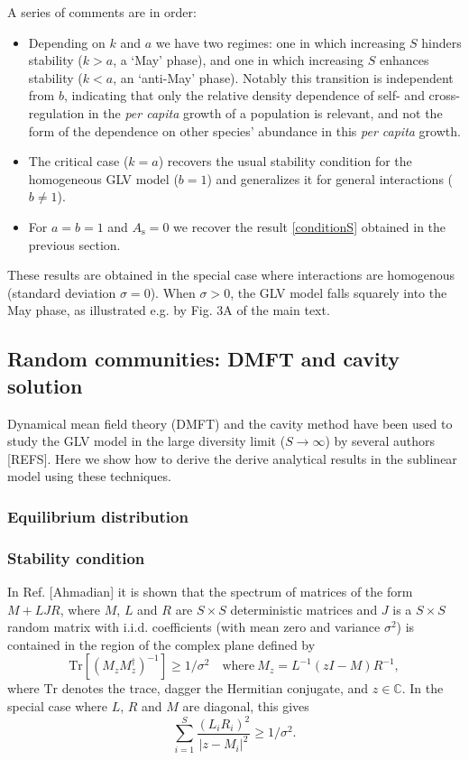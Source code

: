 \documentclass[12pt]{article}
\begin{document}
A series of comments are in order:
\begin{itemize}
    \item Depending on $k$ and $a$ we have two regimes: one in which increasing $S$ hinders stability ($k > a$, a `May' phase), and one in which increasing $S$ enhances stability ($k < a$, an `anti-May' phase). Notably this transition is independent from $b$, indicating that only the relative density dependence of self- and cross-regulation in the \emph{per capita} growth of a population is relevant, and not the form of the dependence on other species' abundance in this \emph{per capita} growth. 
    \item The critical case ($k=a$) recovers the usual stability condition for the homogeneous GLV model ($b=1$) and generalizes it for general interactions ($b\neq 1$).
    \item For $a = b = 1$ and  $ A_{\textrm{s}}=0$ we recover the result \eqref{conditionS} obtained in the previous section. 
\end{itemize}

These results are obtained in the special case where interactions are homogenous (standard deviation $\sigma = 0$). When $\sigma > 0$, the GLV model falls squarely into the May phase, as illustrated e.g. by Fig. 3A of the main text. 

\subsection{Random communities: DMFT and cavity solution}


Dynamical mean field theory (DMFT) and the cavity method have been used to study the GLV model in the large diversity limit ($S\to\infty$) by several authors [REFS]. Here we show how to derive the derive analytical results in the sublinear model using these techniques.

\subsubsection{Equilibrium distribution}


\subsubsection{Stability condition}

In Ref. [Ahmadian] it is shown that the spectrum of matrices of the form 
$M + LJR$, where $M$,  $L$ and $R$ are $S\times S$ deterministic matrices and $J$ 
is a $S\times S$ random matrix with i.i.d. coefficients (with mean zero and variance $\sigma^2$) is contained in the region of the complex plane defined by 
\begin{equation}
    \textrm{Tr}[(M_zM_z^\dagger)^{-1}]\geq 1/\sigma^2 \quad \textrm{where}\ M_z = L^{-1}(zI - M)R^{-1}, 
\end{equation}
where $\textrm{Tr}$ denotes the trace, dagger the Hermitian conjugate, and $z\in\mathbb{C}$. In the special case where 
$L$, $R$ and $M$ are diagonal, this gives
\begin{equation}
    \sum_{i=1}^S\frac{(L_{i}R_{i})^2}{ \vert z - M_{i}\vert^2 }\geq 1/\sigma^2.
\end{equation}
\end{document}
